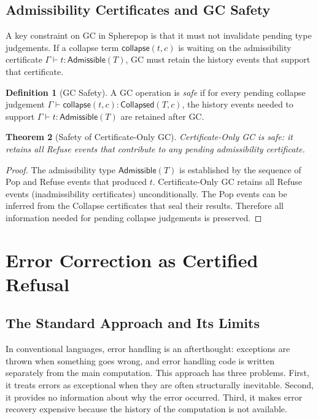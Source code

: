 \documentclass[12pt, a4paper, openany]{book}
\theoremstyle{plain}
\newtheorem{theorem}{Theorem}[chapter]
\theoremstyle{definition}
\newtheorem{definition}[theorem]{Definition}
\theoremstyle{remark}
\newcommand{\Adm}{\mathsf{Admissible}}
\newcommand{\Col}{\mathsf{Collapsed}}
\begin{document}
\section{Admissibility Certificates and GC Safety}

A key constraint on GC in Spherepop is that it must not invalidate pending type
judgements. If a collapse term $\mathsf{collapse}(t, c)$ is waiting on the
admissibility certificate $\Gamma \vdash t : \Adm(T)$, GC must retain the history
events that support that certificate.

\begin{definition}[GC Safety]
A GC operation is \emph{safe} if for every pending collapse judgement
$\Gamma \vdash \mathsf{collapse}(t, c) : \Col(T, c)$, the history events needed
to support $\Gamma \vdash t : \Adm(T)$ are retained after GC.
\end{definition}

\begin{theorem}[Safety of Certificate-Only GC]
Certificate-Only GC is safe: it retains all Refuse events that contribute to
any pending admissibility certificate.
\end{theorem}

\begin{proof}
The admissibility type $\Adm(T)$ is established by the sequence of Pop and Refuse
events that produced $t$. Certificate-Only GC retains all Refuse events
(inadmissibility certificates) unconditionally. The Pop events can be inferred
from the Collapse certificates that seal their results. Therefore all information
needed for pending collapse judgements is preserved.
\end{proof}

\chapter{Error Correction as Certified Refusal}

\section{The Standard Approach and Its Limits}

In conventional languages, error handling is an afterthought: exceptions are
thrown when something goes wrong, and error handling code is written separately
from the main computation. This approach has three problems. First, it treats
errors as exceptional when they are often structurally inevitable. Second, it
provides no information about why the error occurred. Third, it makes error
recovery expensive because the history of the computation is not available.
\end{document}

